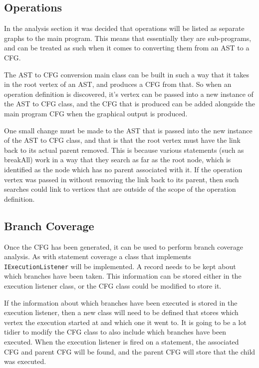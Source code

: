 \subsection{Operations}

In the analysis section it was decided that operations will be listed as separate graphs to the main program. This means that essentially they are sub-programs, and can be treated as such when it comes to converting them from an AST to a CFG.

The AST to CFG conversion main class can be built in such a way that it takes in the root vertex of an AST, and produces a CFG from that. So when an operation definition is discovered, it's vertex can be passed into a new instance of the AST to CFG class, and the CFG that is produced can be added alongside the main program CFG when the graphical output is produced.

One small change must be made to the AST that is passed into the new instance of the AST to CFG class, and that is that the root vertex must have the link back to its actual parent removed. This is because various statements (such as breakAll) work in a way that they search as far as the root node, which is identified as the node which has no parent associated with it. If the operation vertex was passed in without removing the link back to its parent, then such searches could link to vertices that are outside of the scope of the operation definition. 


\subsection{Branch Coverage}

Once the CFG has been generated, it can be used to perform branch coverage analysis. As with statement coverage a class that implements \verb|IExecutionListener| will be implemented. A record needs to be kept about which branches have been taken. This information can be stored either in the execution listener class, or the CFG class could be modified to store it.

If the information about which branches have been executed is stored in the execution listener, then a new class will need to be defined that stores which vertex the execution started at and which one it went to. It is going to be a lot tidier to modify the CFG class to also include which branches have been executed. When the execution listener is fired on a statement, the associated CFG and parent CFG will be found, and the parent CFG will store that the child was executed.

